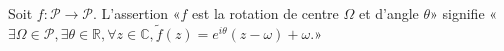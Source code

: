 Soit $f:\mathcal P\to \mathcal P$. L'assertion «$f$ est la rotation de centre $\Omega$ et d'angle $\theta$» signifie «$\exists \Omega\in\mathcal P, \exists \theta\in\mathbb R, \forall z\in\mathbb C, \tilde f(z)=e^{i\theta}(z-\omega)+\omega$.»

\begin{reponses}
\end{reponses}

